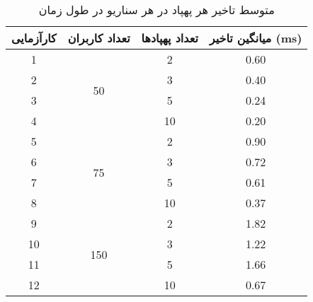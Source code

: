 \begin{table}%
\centering
\caption{ متوسط ​​تاخیر هر پهپاد در هر سناریو در طول زمان}
\begin{tabular}{|c|c|c|c|}
\hline
\multicolumn{1}{|l|}{کارآزمایی} & \multicolumn{1}{l|}{تعداد کاربران} & \multicolumn{1}{l|}{تعداد پهپادها} & \multicolumn{1}{l|}{میانگین تاخیر (ms)} \\ \hline
1                                & \multirow{4}{*}{50}                & 2                                      & 0.60                                      \\ \cline{1-1} \cline{3-4} 
2                                &                                    & 3                                      & 0.40                                      \\ \cline{1-1} \cline{3-4} 
3                                &                                    & 5                                      & 0.24                                      \\ \cline{1-1} \cline{3-4} 
4                                &                                    & 10                                     & 0.20                                      \\ \hline
5                                & \multirow{4}{*}{75}                & 2                                      & 0.90                                      \\ \cline{1-1} \cline{3-4} 
6                                &                                    & 3                                      & 0.72                                      \\ \cline{1-1} \cline{3-4} 
7                                &                                    & 5                                      & 0.61                                      \\ \cline{1-1} \cline{3-4} 
8                                &                                    & 10                                     & 0.37                                      \\ \hline
9                                & \multirow{4}{*}{150}               & 2                                      & 1.82                                      \\ \cline{1-1} \cline{3-4} 
10                               &                                    & 3                                      & 1.22                                      \\ \cline{1-1} \cline{3-4} 
11                               &                                    & 5                                      & 1.66                                      \\ \cline{1-1} \cline{3-4} 
12                               &                                    & 10                                     & 0.67                                      \\ \hline
\end{tabular}
\label{tab:avglatency}
\end{table}\textbf{}